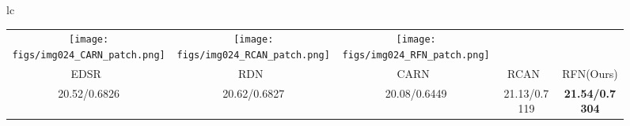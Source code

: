\documentclass[preprint]{elsarticle}
\begin{document}
\begin{figure*}[htpb]
{\begin{tabular}{lc}
\begin{adjustbox}{valign=t}
\begin{tabular}{ccccc}
				\texttt{[image: figs/img024\_CARN\_patch.png]} &
				\hspace{-3mm}
				\texttt{[image: figs/img024\_RCAN\_patch.png]} &
				\hspace{-3mm}
				\texttt{[image: figs/img024\_RFN\_patch.png]} \\
				EDSR~\cite{EDSR} & \hspace{-3mm} RDN~\cite{RDN} & \hspace{-3mm} CARN~\cite{CARN} & \hspace{-3mm} RCAN~\cite{RCAN} & \hspace{-3mm} RFN(Ours) \\
				20.52/0.6826 & \hspace{-3mm} 20.62/0.6827 & \hspace{-3mm} 20.08/0.6449 & \hspace{-3mm} 21.13/0.7119 & \hspace{-3mm} \textbf{21.54/0.7304} \\
			\end{tabular}
			

\end{adjustbox}
\end{tabular}}
\end{figure*}
\end{document}
